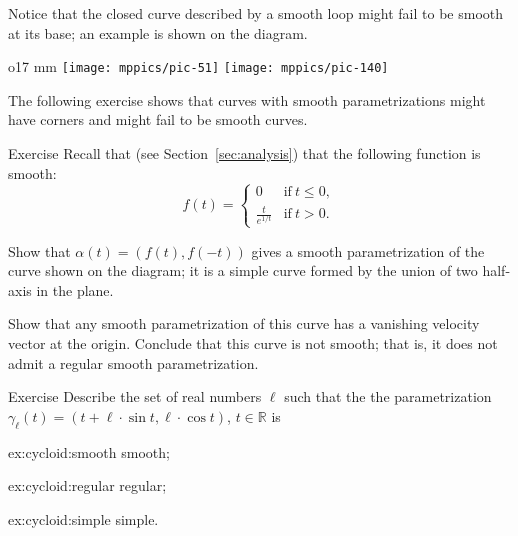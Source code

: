 Notice that the closed curve described by a smooth loop might fail to be smooth at its base; an example is shown on the diagram.

\begin{wrapfigure}{o}{17 mm}
\vskip-4mm
\centering
\texttt{[image: mppics/pic-51]}
\bigskip
\texttt{[image: mppics/pic-140]}
\vskip-8mm
\end{wrapfigure}

The following exercise shows that curves with smooth parametrizations might have corners and might fail to be smooth curves.

\begin{thm}{Exercise}\label{ex:L-shape}
Recall that (see Section~\ref{sec:analysis}) that the following function is smooth: 
\[f(t)=
\begin{cases}
0&\text{if}\ t\le 0,
\\
\frac{t}{e^{1\!/\!t}}&\text{if}\ t> 0.
\end{cases}
\]

Show that $\alpha(t)=(f(t),f(-t))$ gives a smooth parametrization of the curve shown on the diagram;
it is a simple curve formed by the union of two half-axis in the plane.

Show that any smooth parametrization of this curve has a vanishing velocity vector at the origin.
Conclude that this curve is not smooth;
that is, it does not admit a regular smooth parametrization.
\end{thm}


\begin{thm}{Exercise}\label{ex:cycloid}
Describe the set of real numbers $\ell$
such that the the parametrization $\gamma_\ell (t)= (t+\ell \cdot \sin t,\ell \cdot \cos t)$, $t\in\mathbb{R}$ is

\begin{minipage}{.30\textwidth}
\begin{subthm}{ex:cycloid:smooth}
smooth; 
\end{subthm}
\end{minipage}
\hfill
\begin{minipage}{.30\textwidth}
\begin{subthm}{ex:cycloid:regular}
regular;
\end{subthm}
\end{minipage}
\hfill
\begin{minipage}{.30\textwidth}
\begin{subthm}{ex:cycloid:simple}
simple.
\end{subthm}
\end{minipage}

\end{thm}


